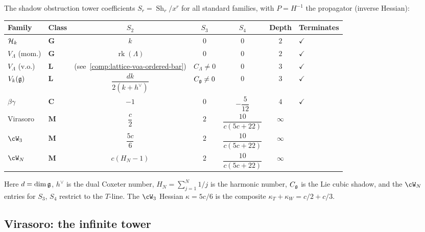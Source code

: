\begin{computation}%
\label{comp:shadow-tower-atlas}%
%
The shadow obstruction tower coefficients $S_r = \operatorname{Sh}_r / x^r$
for all standard families, with $P = H^{-1}$ the propagator
\textup{(}inverse Hessian\textup{)}:

\begin{center}
\small
\renewcommand{\arraystretch}{1.4}
\begin{tabular}{llccccl}
\toprule
\textbf{Family} & \textbf{Class}
& $S_2$ & $S_3$ & $S_4$
& \textbf{Depth} & \textbf{Terminates} \\
\midrule
$\mathcal{H}_k$
 & $\mathbf{G}$
 & $k$
 & $0$
 & $0$
 & $2$
 & $\checkmark$ \\[2pt]
$V_\Lambda$ (mom.)
 & $\mathbf{G}$
 & $\operatorname{rk}(\Lambda)$
 & $0$
 & $0$
 & $2$
 & $\checkmark$ \\[2pt]
$V_\Lambda$ (v.o.)
 & $\mathbf{L}$
 & (see~\ref{comp:lattice-voa-ordered-bar})
 & $C_\Lambda \ne 0$
 & $0$
 & $3$
 & $\checkmark$ \\[2pt]
$V_k(\mathfrak{g})$
 & $\mathbf{L}$
 & $\dfrac{dk}{2(k+h^\vee)}$
 & $C_{\mathfrak{g}}\ne 0$
 & $0$
 & $3$
 & $\checkmark$ \\[4pt]
$\beta\gamma$
 & $\mathbf{C}$
 & $-1$
 & $0$
 & $-\dfrac{5}{12}$
 & $4$
 & $\checkmark$ \\[4pt]
Virasoro
 & $\mathbf{M}$
 & $\dfrac{c}{2}$
 & $2$
 & $\dfrac{10}{c(5c{+}22)}$
 & $\infty$
 & \\[4pt]
$\cW_3$
 & $\mathbf{M}$
 & $\dfrac{5c}{6}$
 & $2$
 & $\dfrac{10}{c(5c{+}22)}$
 & $\infty$
 & \\[4pt]
$\cW_N$
 & $\mathbf{M}$
 & $c(H_N{-}1)$
 & $2$
 & $\dfrac{10}{c(5c{+}22)}$
 & $\infty$
 & \\
\bottomrule
\end{tabular}
\end{center}
Here $d = \dim\mathfrak{g}$, $h^\vee$ is the dual Coxeter number,
$H_N = \sum_{j=1}^N 1/j$ is the harmonic number,
$C_{\mathfrak{g}}$ is the Lie cubic shadow, and the $\cW_N$ entries
for $S_3$, $S_4$ restrict to the $T$-line. The
$\cW_3$ Hessian $\kappa = 5c/6$ is the composite
$\kappa_T + \kappa_W = c/2 + c/3$.
\end{computation}

\subsection{Virasoro: the infinite tower}%
\label{subsec:virasoro-shadow-tower}%

